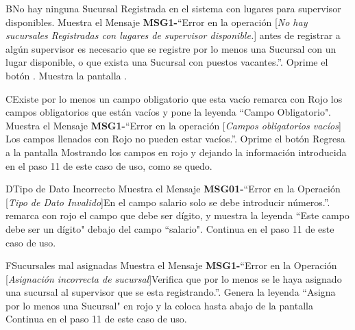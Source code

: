 		\begin{UCtrayectoriaA}{B}{No hay ninguna Sucursal Registrada en el sistema con lugares para supervisor disponibles. }
			\UCpaso Muestra el Mensaje {\bf MSG1-}``Error en la operación [{\em No hay sucursales Registradas con lugares de supervisor disponible.}] antes de registrar a algún supervisor es necesario que se registre por lo menos una Sucursal con un lugar disponible, o que exista una Sucursal con puestos vacantes.''.
			\UCpaso[\UCactor] Oprime el botón .
			\UCpaso Muestra la pantalla .
		\end{UCtrayectoriaA}		
		\begin{UCtrayectoriaA}{C}{Existe por lo menos un campo obligatorio que esta vacío}
			\UCpaso remarca con Rojo los campos obligatorios que están vacíos 
			y pone la leyenda ``Campo Obligatorio".
			\UCpaso Muestra el Mensaje {\bf MSG1-}``Error en la operación [{\em Campos obligatorios vacíos}] Los campos llenados con Rojo no pueden estar vacíos.''.
			\UCpaso[\UCactor] Oprime el botón 
			\UCpaso Regresa a la pantalla  Mostrando los campos en rojo y dejando la información introducida en el paso 11 de este caso de uso, como se quedo.
		\end{UCtrayectoriaA}
		\begin{UCtrayectoriaA}{D}{Tipo de Dato Incorrecto}
		\UCpaso Muestra el Mensaje {\bf MSG01-}``Error en la Operación [{\em Tipo de Dato Invalido}]En el campo salario solo se debe introducir números.''.
			\UCpaso remarca con rojo el campo que debe ser dígito, y muestra la leyenda ``Este campo debe ser un dígito" debajo del campo ``salario".			
			\UCpaso Continua en el paso 11 de este caso de uso.
		\end{UCtrayectoriaA}
		\begin{UCtrayectoriaA}{F}{Sucursales mal asignadas}
		\UCpaso Muestra el Mensaje {\bf MSG1-}``Error en la Operación [{\em Asignación incorrecta de sucursal}]Verifica que por lo menos se le haya asignado una sucursal al supervisor que se esta registrando.''.
			\UCpaso Genera la leyenda ``Asigna por lo menos una Sucursal" en rojo y la coloca hasta abajo de la pantalla 
			\UCpaso Continua en el paso 11 de este caso de uso.
		\end{UCtrayectoriaA}
